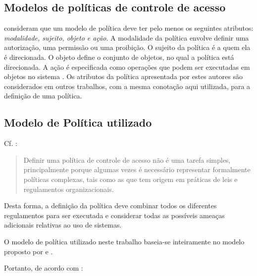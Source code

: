 \subsection{Modelos de políticas de controle de acesso}\label{modelo_politicas}
\cite{moffett_policy_1994} consideram que um modelo de política deve ter pelo menos os seguintes atributos: \textit{modalidade, sujeito, objeto e ação}. A modalidade da política envolve definir uma autorização, uma permissão ou uma proibição. O sujeito da política é a quem ela é direcionada. O objeto define o conjunto de objetos, no qual a política está direcionada. A ação é especificada como operações que podem ser executadas em objetos no sistema \cite{moffett_policy_1994}. Os atributos da política apresentada por estes autores são considerados em outros trabalhos, com a mesma conotação aqui utilizada, para a definição de uma política.\cite{sarkis2017}

\subsection{Modelo de Política utilizado}\label{modelo_politica_utilizada}
Cf. \cite{sarkis2017}:

\begin{quotation}
	Definir uma política de controle de acesso não é uma tarefa simples, principalmente porque algumas vezes é necessário representar formalmente políticas complexas, tais como as que tem origem em práticas de leis e regulamentos organizacionais.
\end{quotation} 

Desta forma, a definição da política deve combinar todos os diferentes regulamentos para ser executada e considerar todas as possíveis ameaças adicionais relativas ao uso de sistemas. \cite{di_vimercati_policies_2005}

O modelo de política utilizado neste trabalho baseia-se inteiramente no modelo proposto por \cite{sarkis2017} e \cite{sarkis:artigo:2016}.

Portanto, de acordo com \cite[p.36]{sarkis2017}:

